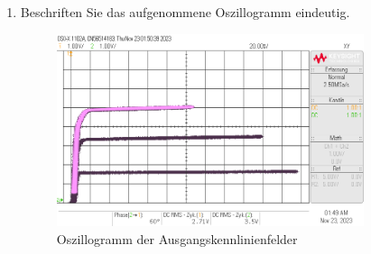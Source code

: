 \begin{enumerate}[label=\alph*)]
  \pagebreak
	\item Beschriften Sie das aufgenommene Oszillogramm eindeutig.
	      \begin{figure}[h!]
		      \begin{center}
			      \includegraphics[width=0.85\textwidth]{img/V1/Ausgang.png}
		      \end{center}
		      \caption{Oszillogramm der Ausgangskennlinienfelder}
	      \end{figure}
\end{enumerate}
